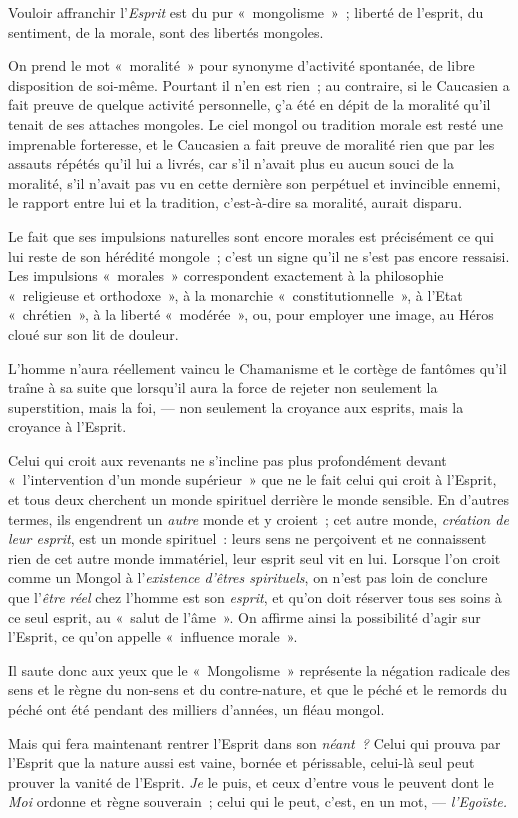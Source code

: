 \documentclass[french,twoside]{book} %
\begin{document}
Vouloir affranchir l’\emph{Esprit} est du pur « mongolisme » ; liberté de l’esprit, du sentiment, de la morale, sont des libertés mongoles.\par
On prend le mot « moralité » pour synonyme d’activité spontanée, de libre disposition de soi-même. Pourtant il n’en est rien ; au contraire, si le Caucasien a fait preuve de quelque activité personnelle, ç’a été en dépit de la moralité qu’il tenait de ses attaches mongoles. Le ciel mongol ou tradition morale est resté une imprenable forteresse, et le Caucasien a fait preuve de moralité rien que par les assauts répétés  qu’il lui a livrés, car s’il n’avait plus eu aucun souci de la moralité, s’il n’avait pas vu en cette dernière son perpétuel et invincible ennemi, le rapport entre lui et la tradition, c’est-à-dire sa moralité, aurait disparu.\par
Le fait que ses impulsions naturelles sont encore morales est précisément ce qui lui reste de son hérédité mongole ; c’est un signe qu’il ne s’est pas encore ressaisi. Les impulsions « morales » correspondent exactement à la philosophie « religieuse et orthodoxe », à la monarchie « constitutionnelle », à l’Etat « chrétien », à la liberté « modérée », ou, pour employer une image, au Héros cloué sur son lit de douleur.\par
L’homme n’aura réellement vaincu le Chamanisme et le cortège de fantômes qu’il traîne à sa suite que lorsqu’il aura la force de rejeter non seulement la superstition, mais la foi, — non seulement la croyance aux esprits, mais la croyance à l’Esprit.\par
Celui qui croit aux revenants ne s’incline pas plus profondément devant « l’intervention d’un monde supérieur » que ne le fait celui qui croit à l’Esprit, et tous deux cherchent un monde spirituel derrière le monde sensible. En d’autres termes, ils engendrent un \emph{autre} monde et y croient ; cet autre monde, \emph{création de leur esprit}, est un monde spirituel : leurs sens ne perçoivent et ne connaissent rien de cet autre monde immatériel, leur esprit seul vit en lui. Lorsque l’on croit comme un Mongol à l’\emph{existence d’êtres spirituels}, on n’est pas loin de conclure que l’\emph{être réel} chez l’homme est son \emph{esprit}, et qu’on doit réserver tous ses soins à ce seul esprit, au « salut de l’âme ». On affirme ainsi la possibilité d’agir sur l’Esprit, ce qu’on appelle « influence morale ».\par
Il saute donc aux yeux que le « Mongolisme » représente la négation radicale des sens et le règne du non-sens et du contre-nature, et que le péché et le remords du péché ont été pendant des milliers d’années, un fléau mongol.\par
 Mais qui fera maintenant rentrer l’Esprit dans son \emph{néant ?} Celui qui prouva par l’Esprit que la nature aussi est vaine, bornée et périssable, celui-là seul peut prouver la vanité de l’Esprit. \emph{Je} le puis, et ceux d’entre vous le peuvent dont le \emph{Moi} ordonne et règne souverain ; celui qui le peut, c’est, en un mot, — \emph{l’Egoïste.}\par
\end{document}
